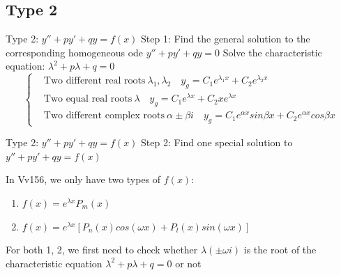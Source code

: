 \documentclass{beamer}
\begin{document}
\subsection{Type 2}

\begin{frame}{Type 2: $y'' + py' + qy = f(x)$}
Step 1: Find the general solution to the corresponding homogeneous ode $y'' + py' + qy = 0$
    Solve the characteristic equation: $\lambda^2 + p\lambda + q = 0$
    \begin{equation*}
        \left\{
        \begin{aligned}
        &\text{Two different real roots} \ \lambda_1, \lambda_2 \quad y_g = C_1 e^{\lambda_1 x} + C_2 e^{\lambda_2 x}\\
        & \text{Two equal real roots} \ \lambda \quad y_g = C_1 e^{\lambda x} + C_2 xe^{\lambda x}\\
        & \text{Two different complex roots} \ \alpha\pm \beta i \quad y_g = C_1 e^{\alpha x}sin\beta x + C_2 e^{\alpha x}cos\beta x
        \end{aligned}
        \right.
    \end{equation*}
    
\end{frame}

\begin{frame}{Type 2: $y'' + py' + qy = f(x)$}
    Step 2: Find one special solution to $y'' + py' + qy = f(x)$ 
    
    In Vv156, we only have two types of $f(x)$:
    \begin{enumerate}
        \item $f(x) = e^{\lambda x}P_m(x)$
        \item $f(x) = e^{\lambda x}[P_n(x)cos(\omega x) + P_l(x) sin(\omega x)]$
    \end{enumerate}
    For both 1, 2, we first need to check whether $\lambda (\pm \omega i)$ is the root of the characteristic equation $\lambda^2 + p \lambda + q = 0$ or not
    
    
    
\end{frame}
\end{document}
